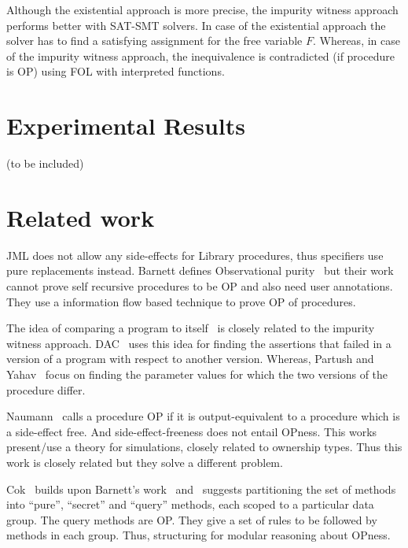 \documentclass{llncs}
\newcommand{\F}{\mathit{F}}
\begin{document}
Although the existential approach is more precise, the impurity
witness approach performs better with SAT-SMT solvers. In case of the
existential approach the solver has to find a satisfying assignment
for the free variable $\F$. Whereas, in case of the impurity witness
approach, the inequivalence is contradicted (if procedure is OP) using
FOL with interpreted functions.

\section{Experimental Results}

(to be included)
\section{Related work}
JML does not allow any side-effects for Library procedures, thus
specifiers use pure replacements instead. Barnett defines
Observational purity~\cite{barnett200499} but their work cannot prove
self recursive procedures to be OP and also need user
annotations. They use a information flow based technique to prove OP
of procedures.

The idea of comparing a program to itself~\cite{lahiri2013differential}
\cite{partush2013abstract} is closely related to the impurity witness
approach. DAC~\cite{lahiri2013differential} uses this idea for
finding the assertions that failed in a version of a program with
respect to another version. Whereas, Partush and
Yahav~\cite{partush2013abstract} focus on finding the parameter values
for which the two versions of the procedure differ.

Naumann~\cite{naumann2007observational} calls a procedure OP if it is
output-equivalent to a procedure which is a side-effect free. And
side-effect-freeness does not entail OPness. This works present/use
a theory for simulations, closely related to ownership types. Thus
this work is closely related but they solve a different problem.

Cok~\cite{cok2008extensions} builds upon Barnett's
work~\cite{barnett2006allowing} and~\cite{barnett200499} suggests
partitioning the set of methods into ``pure'', ``secret'' and ``query''
methods, each scoped to a particular data group. The query methods are
OP. They give a set of rules to be followed by methods in each
group. Thus, structuring for modular reasoning about OPness.
\end{document}
